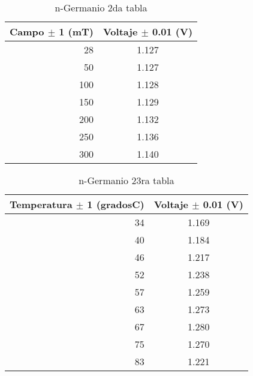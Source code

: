 \documentclass[aps,prl,reprint]{revtex4-1}
\begin{document}
\begin{table}[H]
\begin{center}
\begin{tabular}
{|| r || c ||} 
\hline\hline
Campo $\pm$ 1 (mT) & Voltaje $\pm$ 0.01 (V) \\ 
\hline

28 & 1.127\\
50&1.127\\
100 & 1.128\\
150 & 1.129 \\
200 & 1.132\\
250 & 1.136\\
300 & 1.140 \\

\hline\hline
\end{tabular}
\end{center}
\caption{n-Germanio 2da tabla}
\label{2n}
\end{table}




\begin{table}[H]
\begin{center}
\begin{tabular}
{|| r || c ||} 
\hline\hline
Temperatura $\pm$ 1 (gradosC) & Voltaje $\pm$ 0.01 (V)\\  

\hline

34 & 1.169 \\
40 & 1.184 \\
46 & 1.217 \\
52 & 1.238 \\
57 & 1.259 \\
63 & 1.273 \\
67 &  1.280 \\
75 & 1.270 \\
83 & 1.221 \\

\hline\hline
\end{tabular}
\end{center}
\caption{n-Germanio 23ra tabla}
\label{3n}
\end{table}
\end{document}
